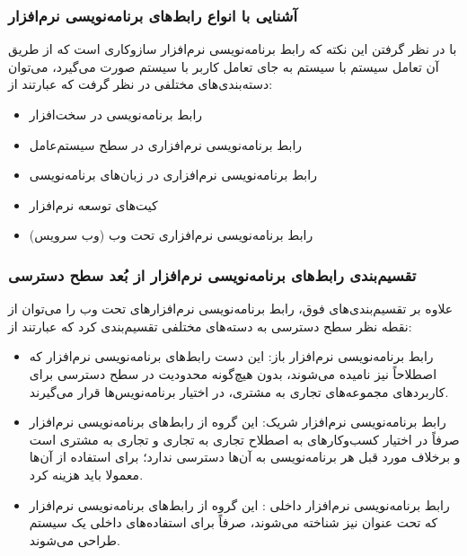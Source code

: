 {{\subsubsection{آشنایی با انواع رابط‌های برنامه‌نویسی نرم‌افزار}
با در نظر گرفتن این نکته که رابط‌ برنامه‌نویسی نرم‌افزار سازوکاری است که از طریق آن تعامل سیستم با سیستم به جای تعامل کاربر با سیستم صورت می‌گیرد، می‌توان دسته‌بند‌ی‌های مختلفی در نظر گرفت که عبارتند از:

\begin{itemize}
	\item رابط برنامه‌نویسی در سخت‌افزار
	\item رابط برنامه‌نویسی نرم‌افزاری در سطح سیستم‌عامل
	\item رابط برنامه‌نویسی نرم‌افزاری در زبان‌های برنامه‌نویسی
	\item کیت‌های توسعه نرم‌افزار
	\item رابط برنامه‌نویسی نرم‌افزاری تحت وب (وب سرویس)
\end{itemize}
 

\subsubsection{تقسیم‌بندی رابط‌های برنامه‌نویسی نرم‌افزار از بُعد سطح دسترسی}
علاوه بر تقسیم‌بندی‌های فوق،‌ رابط برنامه‌نویسی نرم‌افزارهای تحت وب را می‌توان از نقطه نظر سطح دسترسی به دسته‌های مختلفی تقسیم‌بندی کرد که عبارتند از:
\begin{itemize}
	\item رابط برنامه‌نویسی نرم‌افزار باز: این دست رابط‌های برنامه‌نویسی نرم‌افزار که اصطلاحاً  نیز نامیده می‌شوند، بدون هیچ‌گونه محدودیت در سطح دسترسی برای کاربردهای مجموعه‌های تجاری به مشتری، در اختیار برنامه‌نویس‌ها قرار می‌گیرند.
	\item رابط برنامه‌نویسی نرم‌افزار شریک: این گروه از رابط‌های برنامه‌نویسی نرم‌افزار صرفاً در اختیار کسب‌وکارهای به اصطلاح تجاری به تجاری و تجاری به مشتری است و برخلاف مورد قبل هر برنامه‌نویسی به آن‌ها دسترسی ندارد؛ برای استفاده از آن‌ها معمولا باید هزینه کرد.
	\item رابط برنامه‌نویسی نرم‌افزار داخلی : این گروه از رابط‌های برنامه‌نویسی نرم‌افزار که تحت عنوان  نیز شناخته می‌شوند، صرفاً برای استفاده‌های داخلی یک سیستم طراحی می‌شوند.

\end{itemize}

}}
